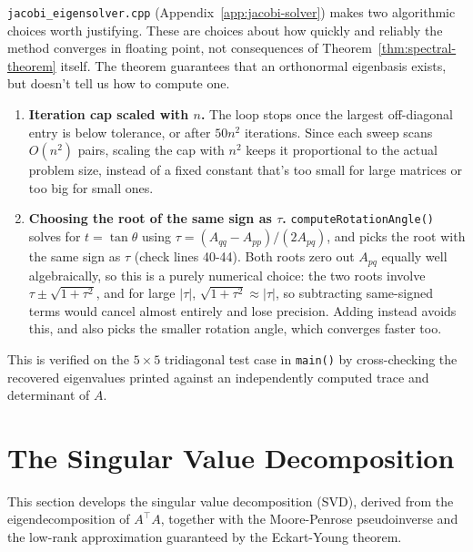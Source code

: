 	\begin{compremark}
		\texttt{jacobi\_eigensolver.cpp} (Appendix~\ref{app:jacobi-solver}) makes two algorithmic choices worth justifying. These are choices about how quickly and reliably the method converges in floating point, not consequences of Theorem~\ref{thm:spectral-theorem} itself. The theorem guarantees that an orthonormal eigenbasis exists, but doesn't tell us how to compute one.
		
		\begin{enumerate}[label=\roman*.]
			\item \textbf{Iteration cap scaled with $n$.} The loop stops once the largest off-diagonal entry is below tolerance, or after $50n^2$ iterations. Since each sweep scans $O(n^2)$ pairs, scaling the cap with $n^2$ keeps it proportional to the actual problem size, instead of a fixed constant that's too small for large matrices or too big for small ones.
			
			\item \textbf{Choosing the root of the same sign as $\tau$.} \texttt{computeRotationAngle()} solves for $t=\tan\theta$ using $\tau = (A_{qq}-A_{pp})/(2A_{pq})$, and picks the root with the same sign as $\tau$ (check lines 40-44). Both roots zero out $A_{pq}$ equally well algebraically, so this is a purely numerical choice: the two roots involve $\tau\pm\sqrt{1+\tau^2}$, and for large $|\tau|$, $\sqrt{1+\tau^2}\approx|\tau|$, so subtracting same-signed terms would cancel almost entirely and lose precision. Adding instead avoids this, and also picks the smaller rotation angle, which converges faster too.
		\end{enumerate}
		
		This is verified on the $5\times 5$ tridiagonal test case in \texttt{main()} by cross-checking the recovered eigenvalues printed against an independently computed trace and determinant of $A$.
	\end{compremark}
	
\section{The Singular Value Decomposition}
	
	This section develops the singular value decomposition (SVD), derived from the eigendecomposition of $A^\top A$, together with the Moore-Penrose pseudoinverse and the low-rank approximation guaranteed by the Eckart-Young theorem. \\
	
